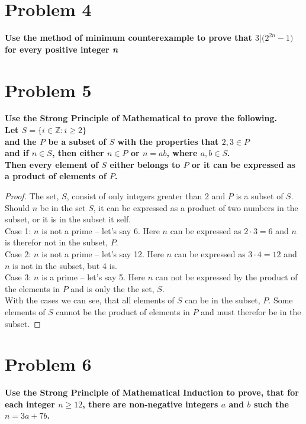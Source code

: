 \documentclass[english,11pt,a4paper]{article}
\begin{document}
\section*{Problem 4}
\textbf{Use the method of minimum counterexample to prove that $3|\Big(2^{2n}-1\Big)$ for every positive integer \textit{n}}



\section*{Problem 5}
\textbf{Use the Strong Principle of Mathematical to prove the following.\\
Let $S= \{ i \in \mathbb{Z} : i \geq 2\}$ \\
and the $P$ be a subset of $S$ with the properties that $2,3 \in P$ \\
and if $n \in S$, then either $n \in P$ or $n=ab$, where $a,b\in S$. \\
Then every element of $S$ either belongs to $P$ or it can be expressed as a product of elements of $P$.}
\begin{proof}
The set, $S$, consist of only integers greater than 2 and $P$ is a subset of $S$.
Should $n$ be in the set $S$, it can be expressed as a product of two numbers in the subset, or it is in the subset it self.
\\
Case 1: $n$ is not a prime -- let's say 6. Here $n$ can be expressed as $2 \cdot 3 = 6$ and $n$ is therefor not in the subset, $P$.
\\
Case 2: $n$ is not a prime -- let's say 12. Here $n$ can be expressed as $3 \cdot 4 = 12$ and $n$ is not in the subset, but 4 is.
\\
Case 3: $n$ is a prime -- let's say 5. Here $n$ can not be expressed by the product of the elements in $P$ and is only the the set, $S$.
\\
With the cases we can see, that all elements of $S$ can be in the subset, $P$. 
Some elements of $S$ cannot be the product of elements in $P$ and must therefor be in the subset.
\end{proof}





\section*{Problem 6}
\textbf{Use the Strong Principle of Mathematical Induction to prove, that for each integer $n\geq 12$, there are non-negative integers $a$ and $b$ such the $n=3a+7b$.}
\end{document}
